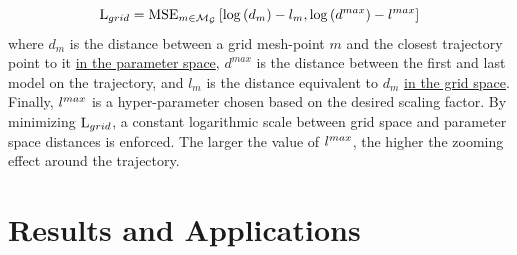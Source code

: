 \documentclass[letterpaper]{article} %
\begin{document}
            \begin{equation}
               \text{L}_{grid} = \text{MSE}_{m \in \mathcal{M_G}} \left[ \log{\left( d_m \right) - l_m , \log{\left( d^{max} \right)} - l^{max}} \right]
            \end{equation}
            where $d_m$ is the distance between a grid mesh-point $m$ and the closest trajectory point to it \underline{in the parameter space}, $d^{max}$ is the distance between the first and last model on the trajectory, and $l_m$ is the distance equivalent to $d_m$ \underline{in the grid space}. Finally, $l^{max}$ is a hyper-parameter chosen based on the desired scaling factor. 
            By minimizing $\text{L}_{grid}$, a constant logarithmic scale between grid space and parameter space distances is enforced. The larger the value of $l^{max}$, the higher the zooming effect around the trajectory.
        


            

        \section{Results and Applications} \label{resultslandscape}
\end{document}
